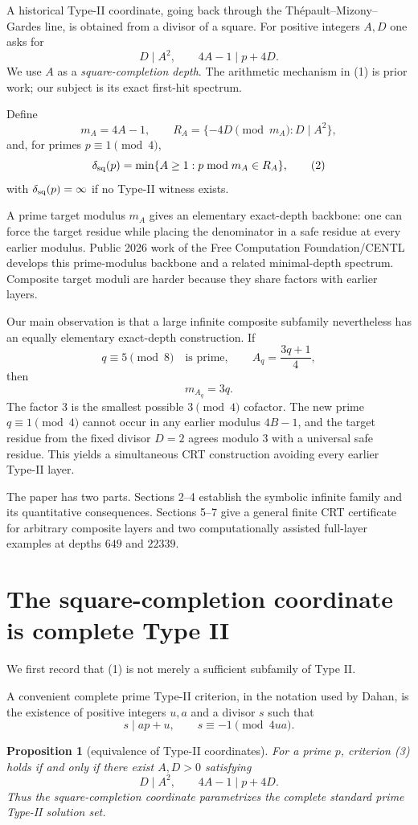 \documentclass[11pt]{article}
\newtheorem{proposition}[theorem]{Proposition}
\theoremstyle{definition}
\begin{document}
A historical Type-II coordinate, going back through the Th\'epault--Mizony--Gardes line, is obtained from a divisor of a square.  For positive integers $A,D$ one asks for
\[
D\mid A^2,\qquad 4A-1\mid p+4D. \tag{1}
\]
We use $A$ as a \emph{square-completion depth}.  The arithmetic mechanism in (1) is prior work; our subject is its exact first-hit spectrum.

Define
\[
m_A=4A-1,
\qquad
R_A=\{-4D\pmod{m_A}:D\mid A^2\},
\]
and, for primes $p\equiv1\pmod4$,
\[
\delta_{\rm sq}(p)
=\min\{A\ge1:p\bmod m_A\in R_A\}, \tag{2}
\]
with $\delta_{\rm sq}(p)=\infty$ if no Type-II witness exists.

A prime target modulus $m_A$ gives an elementary exact-depth backbone: one can force the target residue while placing the denominator in a safe residue at every earlier modulus.  Public 2026 work of the Free Computation Foundation/CENTL develops this prime-modulus backbone and a related minimal-depth spectrum.  Composite target moduli are harder because they share factors with earlier layers.

Our main observation is that a large infinite composite subfamily nevertheless has an equally elementary exact-depth construction.  If
\[
q\equiv5\pmod8\quad\text{is prime},
\qquad
A_q=\frac{3q+1}{4},
\]
then
\[
m_{A_q}=3q.
\]
The factor $3$ is the smallest possible $3\pmod4$ cofactor.  The new prime $q\equiv1\pmod4$ cannot occur in any earlier modulus $4B-1$, and the target residue from the fixed divisor $D=2$ agrees modulo $3$ with a universal safe residue.  This yields a simultaneous CRT construction avoiding every earlier Type-II layer.

The paper has two parts.  Sections 2--4 establish the symbolic infinite family and its quantitative consequences.  Sections 5--7 give a general finite CRT certificate for arbitrary composite layers and two computationally assisted full-layer examples at depths $649$ and $22339$.

\section{The square-completion coordinate is complete Type II}
We first record that (1) is not merely a sufficient subfamily of Type II.

A convenient complete prime Type-II criterion, in the notation used by Dahan, is the existence of positive integers $u,a$ and a divisor $s$ such that
\[
s\mid ap+u,
\qquad
s\equiv-1\pmod{4ua}. \tag{3}
\]

\begin{proposition}[equivalence of Type-II coordinates]
For a prime $p$, criterion \emph{(3)} holds if and only if there exist $A,D>0$ satisfying
\[
D\mid A^2,
\qquad
4A-1\mid p+4D. \tag{4}
\]
Thus the square-completion coordinate parametrizes the complete standard prime Type-II solution set.
\end{proposition}
\end{document}

